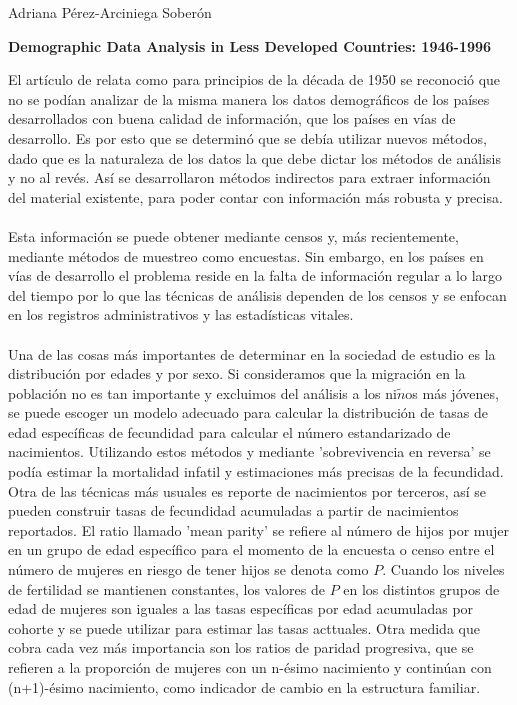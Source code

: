 \documentclass[11pt,spanish,letterpaper]{article}
\theoremstyle{plain}
\begin{document}
\begin{flushleft}
Adriana P\'erez-Arciniega Sober\'on
\end{flushleft}
\begin{center}
\textbf{Demographic Data Analysis in Less Developed Countries: 1946-1996}
\end{center}
El art\'iculo de \cite{brass1996demographic} relata como para principios de la d\'ecada de 1950 se reconoci\'o que no se pod\'ian analizar de la misma manera los datos demogr\'aficos de los pa\'ises desarrollados con buena calidad de informaci\'on, que los pa\'ises en v\'ias de desarrollo. Es por esto que se determin\'o que se deb\'ia utilizar nuevos m\'etodos, dado que es la naturaleza de los datos la que debe dictar los m\'etodos de an\'alisis y no al rev\'es. As\'i se desarrollaron m\'etodos indirectos para extraer informaci\'on del material existente, para poder contar con informaci\'on m\'as robusta y precisa. \\
\\
Esta informaci\'on se puede obtener mediante censos y, m\'as recientemente, mediante m\'etodos de muestreo como encuestas. Sin embargo, en los pa\'ises en v\'ias de desarrollo el problema reside en la falta de informaci\'on regular a lo largo del tiempo por lo que las t\'ecnicas de an\'alisis dependen de los censos  y se enfocan en los registros administrativos y las estad\'isticas vitales.\\
\\
Una de las cosas m\'as importantes de determinar en la sociedad de estudio es la distribuci\'on por edades y por sexo. Si consideramos que la migraci\'on en la poblaci\'on no es tan importante y excluimos del an\'alisis a los ni$\tilde{n}$os m\'as j\'ovenes, se puede escoger un modelo adecuado para calcular la distribuci\'on de tasas de edad espec\'ificas de fecundidad para calcular el n\'umero  estandarizado de nacimientos. Utilizando estos m\'etodos y mediante 'sobrevivencia en reversa' se pod\'ia estimar la mortalidad infatil y estimaciones m\'as precisas de la fecundidad. Otra de las t\'ecnicas m\'as usuales es reporte de nacimientos por terceros, as\'i se pueden construir tasas de fecundidad acumuladas a partir de nacimientos reportados. El ratio llamado 'mean parity' se refiere al n\'umero de hijos por mujer en un grupo de edad espec\'ifico para el momento de la encuesta o censo entre el n\'umero de mujeres en riesgo de tener hijos se denota como $P$. Cuando los niveles de fertilidad se mantienen constantes, los valores de $P$ en los distintos grupos de edad de mujeres son iguales a las tasas espec\'ificas por edad acumuladas por cohorte y se puede utilizar para estimar las tasas acttuales. Otra medida que cobra cada vez m\'as importancia son los ratios de paridad progresiva, que se refieren a la proporci\'on de mujeres con un n-\'esimo nacimiento y contin\'uan con (n+1)-\'esimo nacimiento, como indicador de cambio en la estructura familiar. \\
\end{document}
